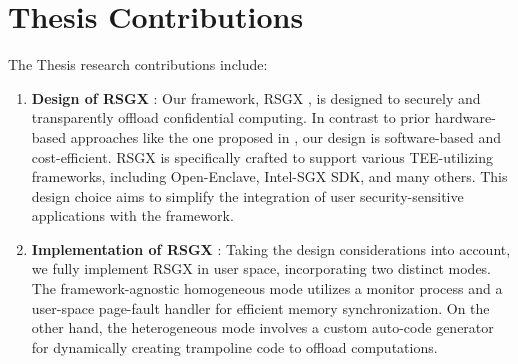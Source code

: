 \documentclass[article, doublespace,nopageskip]{VTthesis} %
\newcommand{\monitor}{RSGX \xspace}
\begin{document}
    \section{Thesis Contributions}
    The Thesis research contributions include:
    \begin{enumerate}
        \item \textbf{Design of \monitor}: Our framework, \monitor, is designed to securely and transparently offload confidential computing. In contrast to prior hardware-based approaches like the one proposed in \cite{APEX}, our design is software-based and cost-efficient. \monitor is specifically crafted to support various TEE-utilizing frameworks, including Open-Enclave, Intel-SGX SDK, and many others. This design choice aims to simplify the integration of user security-sensitive applications with the framework.
        \item \textbf{Implementation of \monitor}: Taking the design considerations into account, we fully implement \monitor in user space, incorporating two distinct modes. The framework-agnostic homogeneous mode utilizes a monitor process and a user-space page-fault handler for efficient memory synchronization. On the other hand, the heterogeneous mode involves a custom auto-code generator for dynamically creating trampoline code to offload computations.

\end{enumerate}
\end{document}

